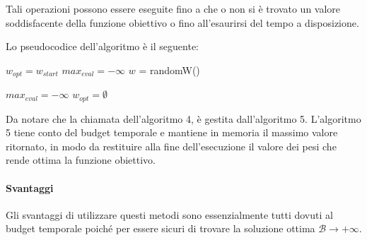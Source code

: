 Tali operazioni possono essere eseguite fino a che o non si è trovato un valore
soddisfacente della funzione obiettivo o fino all'esaurirsi del tempo a disposizione.

\pagebreak

Lo pseudocodice dell'algoritmo è il seguente:
\begin{algorithm}[h!]
	\small
	\DontPrintSemicolon
	\BlankLine

	$w_{opt} = w_{start}$\;
	$max_{eval} = -\infty$\;
	$w$ = randomW()\;
		
	\BlankLine
	
	
	\caption{\textsc{}}
	\label{alg:lsrs}
\end{algorithm}



\begin{algorithm}[h!]
	\small
	\DontPrintSemicolon
	\BlankLine
	
	$max_{eval} = -\infty$\;
	$w_{opt} = \emptyset $\;
	
	\caption{\textsc{}}
	\label{alg:lsrsm}
\end{algorithm}

Da notare che la chiamata dell'algoritmo 4, è gestita
dall'algoritmo 5. L'algoritmo 5 tiene conto del budget temporale e mantiene in memoria
il massimo valore ritornato, in modo da restituire alla fine dell'esecuzione
il valore dei pesi che rende ottima la funzione obiettivo.

\paragraph{Svantaggi}
Gli svantaggi di utilizzare questi metodi sono essenzialmente tutti dovuti al budget temporale
poiché per essere sicuri di trovare la soluzione ottima $\mathcal{B} \to +\infty$.



